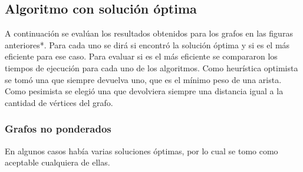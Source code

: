 \documentclass[a4paper,10pt]{article}
\begin{document}
\subsection{Algoritmo con solución óptima}

A continuación se evalúan los resultados obtenidos para los grafos en las figuras anteriores*. Para cada uno se dirá si encontró la solución óptima y si es el más eficiente para ese caso. Para evaluar si es el más eficiente se compararon los tiempos de ejecución para cada uno de los algoritmos. Como heurística optimista se tomó una que siempre devuelva uno, que es el mínimo peso de una arista. Como pesimista se elegió una que devolviera siempre una distancia igual a la cantidad de vértices del grafo.

\subsubsection{Grafos no ponderados}

En algunos casos había varias soluciones óptimas, por lo cual se tomo como aceptable cualquiera de ellas.

\begin{table}[H]
\centering
{}
\caption{Resultados por grafo no ponderado}
\label{tab:datosexp}
\end{table}
\end{document}
